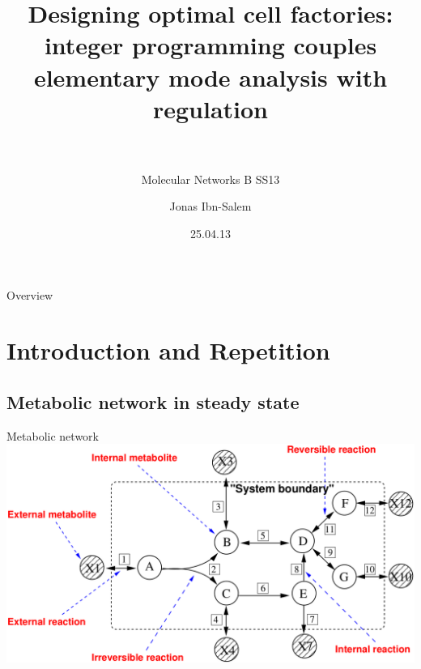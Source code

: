 \documentclass{beamer}
\title[Elementary mode analysis]{Designing optimal cell factories:
integer programming couples elementary mode analysis with regulation\\~\\}
\subtitle{Molecular Networks B SS13}
\author[Jonas Ibn-Salem]{Jonas Ibn-Salem}
\institute[]{}
\date{25.04.13}
\begin{document}
\maketitle


\begin{frame}{Overview}
    \tableofcontents
\end{frame}

\section{Introduction and Repetition}
\subsection{Metabolic network in steady state}
\begin{frame}{Metabolic network}
    \includegraphics[width=\textwidth]{grafik/molnet}
\end{frame}
\end{document}
